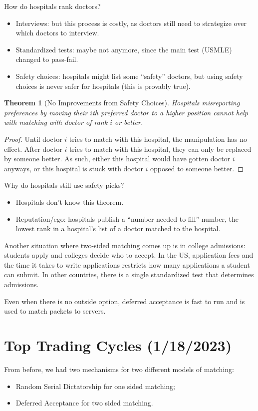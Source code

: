 \documentclass[dvipsnames]{article}
\newtheorem{theorem}{Theorem}[section]
\theoremstyle{definition}
\theoremstyle{remark}
\begin{document}
How do hospitals rank doctors?
\begin{itemize}
	\item Interviews: but this process is costly, as doctors still need to strategize over which doctors to interview.
	\item Standardized tests: maybe not anymore, since the main test (USMLE) changed to pass-fail.
	\item Safety choices: hospitals might list some ``safety'' doctors, but using safety choices is never safer for hospitals (this is provably true).
\end{itemize}

\begin{theorem}[No Improvements from Safety Choices]
	Hospitals misreporting preferences by moving their $i$th preferred doctor to a higher position cannot help with matching with doctor of rank $i$ or better.
\end{theorem}

\begin{proof}
	Until doctor $i$ tries to match with this hospital, the manipulation has no effect. After doctor $i$ tries to match with this hospital, they can only be replaced by someone better. As such, either this hospital would have gotten doctor $i$ anyways, or this hospital is stuck with doctor $i$ opposed to someone better.
\end{proof}

Why do hospitals still use safety picks?
\begin{itemize}
	\item Hospitals don't know this theorem.
	\item Reputation/ego: hospitals publish a ``number needed to fill'' number, the lowest rank in a hospital's list of a doctor matched to the hospital.
\end{itemize}

Another situation where two-sided matching comes up is in college admissions: students apply and colleges decide who to accept. In the US, application fees and the time it takes to write applications restricts how many applications a student can submit. In other countries, there is a single standardized test that determines admissions.

Even when there is no outside option, deferred acceptance is fast to run and is used to match packets to servers.	

\newpage

\section{Top Trading Cycles (1/18/2023)}
From before, we had two mechanisms for two different models of matching:
\begin{itemize}
	\item Random Serial Dictatorship for one sided matching;
	\item Deferred Acceptance for two sided matching.
\end{itemize}
\end{document}
